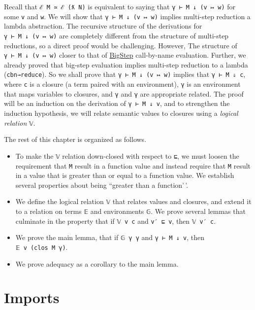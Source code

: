 Recall that \texttt{ℰ\ M\ ≃\ ℰ\ (ƛ\ N)} is equivalent to saying that
\texttt{γ\ ⊢\ M\ ↓\ (v\ ↦\ w)} for some \texttt{v} and \texttt{w}. We
will show that \texttt{γ\ ⊢\ M\ ↓\ (v\ ↦\ w)} implies multi-step
reduction a lambda abstraction. The recursive structure of the
derivations for \texttt{γ\ ⊢\ M\ ↓\ (v\ ↦\ w)} are completely different
from the structure of multi-step reductions, so a direct proof would be
challenging. However, The structure of \texttt{γ\ ⊢\ M\ ↓\ (v\ ↦\ w)}
closer to that of \protect\hyperlink{BigStep}{BigStep} call-by-name
evaluation. Further, we already proved that big-step evaluation implies
multi-step reduction to a lambda (\texttt{cbn→reduce}). So we shall
prove that \texttt{γ\ ⊢\ M\ ↓\ (v\ ↦\ w)} implies that
\texttt{γ\textquotesingle{}\ ⊢\ M\ ⇓\ c}, where \texttt{c} is a closure
(a term paired with an environment), \texttt{γ\textquotesingle{}} is an
environment that maps variables to closures, and \texttt{γ} and
\texttt{γ\textquotesingle{}} are appropriate related. The proof will be
an induction on the derivation of \texttt{γ\ ⊢\ M\ ↓\ v}, and to
strengthen the induction hypothesis, we will relate semantic values to
closures using a \emph{logical relation} \texttt{𝕍}.

The rest of this chapter is organized as follows.

\begin{itemize}
\item
  To make the \texttt{𝕍} relation down-closed with respect to
  \texttt{⊑}, we must loosen the requirement that \texttt{M} result in a
  function value and instead require that \texttt{M} result in a value
  that is greater than or equal to a function value. We establish
  several properties about being ``greater than a function'\,'.
\item
  We define the logical relation \texttt{𝕍} that relates values and
  closures, and extend it to a relation on terms \texttt{𝔼} and
  environments \texttt{𝔾}. We prove several lemmas that culminate in the
  property that if \texttt{𝕍\ v\ c} and \texttt{v′\ ⊑\ v}, then
  \texttt{𝕍\ v′\ c}.
\item
  We prove the main lemma, that if \texttt{𝔾\ γ\ γ\textquotesingle{}}
  and \texttt{γ\ ⊢\ M\ ↓\ v}, then
  \texttt{𝔼\ v\ (clos\ M\ γ\textquotesingle{})}.
\item
  We prove adequacy as a corollary to the main lemma.
\end{itemize}

\hypertarget{imports}{%
\section{Imports}\label{imports}}

